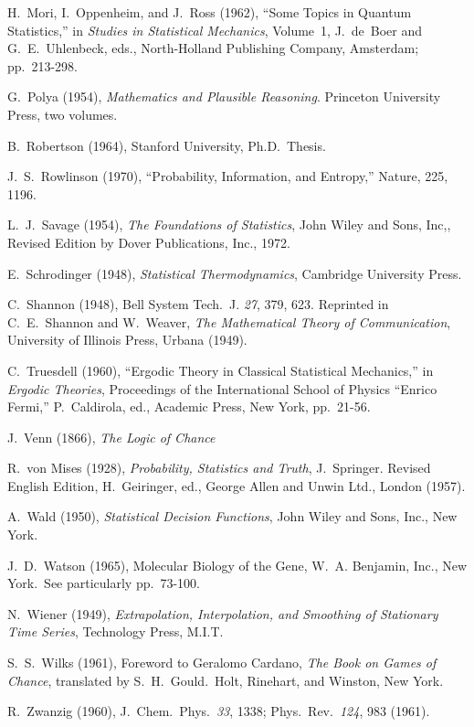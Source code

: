 \begin{itemize}[label={}, leftmargin=*, itemsep={0.5\baselineskip plus 2pt}]
 H.~Mori, I.~Oppenheim, and J.~Ross (1962), ``Some Topics in Quantum Statistics,'' in \emph{Studies in Statistical Mechanics}, Volume~1, J.~de~Boer and G.~E.~Uhlenbeck, eds., North-Holland Publishing Company, Amsterdam; pp.~213-298.

 G.~Polya (1954), \emph{Mathematics and Plausible Reasoning}. Princeton University Press, two volumes.

 B.~Robertson (1964), Stanford University, Ph.D.~Thesis.

 J.~S.~Rowlinson (1970), ``Probability, Information, and Entropy,'' Nature, 225, 1196.

 L.~J.~Savage (1954), \emph{The Foundations of Statistics}, John Wiley and Sons, Inc,, Revised Edition by Dover Publications, Inc., 1972.

 E.~Schrodinger (1948), \emph{Statistical Thermodynamics}, Cambridge University Press.

 C.~Shannon (1948), Bell System Tech.~J. \emph{27}, 379, 623. Reprinted in C.~E.~Shannon and W.~Weaver, \emph{The Mathematical Theory of Communication}, University of Illinois Press, Urbana (1949).

 C.~Truesdell (1960), ``Ergodic Theory in Classical Statistical Mechanics,'' in \emph{Ergodic Theories}, Proceedings of the International School of Physics ``Enrico Fermi,'' P.~Caldirola, ed., Academic Press, New York, pp.~21-56.

 J.~Venn (1866), \emph{The Logic of Chance}

 R.~von Mises (1928), \emph{Probability, Statistics and Truth}, J.~Springer. Revised English Edition, H.~Geiringer, ed., George Allen and Unwin Ltd., London (1957).

 A.~Wald (1950), \emph{Statistical Decision Functions}, John Wiley and Sons, Inc., New York.

 J.~D.~Watson (1965), Molecular Biology of the Gene, W.~A. Benjamin, Inc., New York.~See particularly pp.~73-100.

 N.~Wiener (1949), \emph{Extrapolation, Interpolation, and Smoothing of Stationary Time Series}, Technology Press, M.I.T.

 S.~S.~Wilks (1961), Foreword to Geralomo Cardano, \emph{The Book on Games of Chance}, translated by S.~H.~Gould.~Holt, Rinehart, and Winston, New York.

 R.~Zwanzig (1960), J.~Chem.~Phys.~\emph{33}, 1338; Phys.~Rev.~\emph{124}, 983 (1961).
\end{itemize}

\restoregeometry